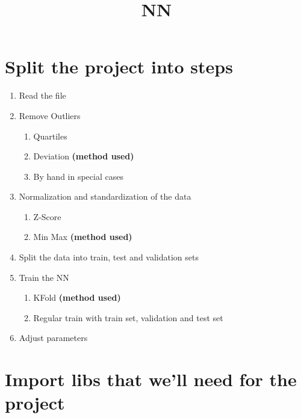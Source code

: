 \documentclass[11pt]{article}
\title{NN}
\providecommand{\tightlist}{%
      \setlength{\itemsep}{0pt}\setlength{\parskip}{0pt}}
\begin{document}
    
    \maketitle
    
    

    
    \hypertarget{split-the-project-into-steps}{%
\section{Split the project into
steps}\label{split-the-project-into-steps}}

\begin{enumerate}
\def\labelenumi{\arabic{enumi}.}
\tightlist
\item
  Read the file
\item
  Remove Outliers

  \begin{enumerate}
  \def\labelenumii{\arabic{enumii}.}
  \tightlist
  \item
    Quartiles
  \item
    Deviation \textbf{(method used)}
  \item
    By hand in special cases
  \end{enumerate}
\item
  Normalization and standardization of the data

  \begin{enumerate}
  \def\labelenumii{\arabic{enumii}.}
  \tightlist
  \item
    Z-Score
  \item
    Min Max \textbf{(method used)}
  \end{enumerate}
\item
  Split the data into train, test and validation sets
\item
  Train the NN

  \begin{enumerate}
  \def\labelenumii{\arabic{enumii}.}
  \tightlist
  \item
    KFold \textbf{(method used)}
  \item
    Regular train with train set, validation and test set
  \end{enumerate}
\item
  Adjust parameters
\end{enumerate}

    \hypertarget{import-libs-that-well-need-for-the-project}{%
\section{Import libs that we'll need for the
project}\label{import-libs-that-well-need-for-the-project}}
\end{document}
